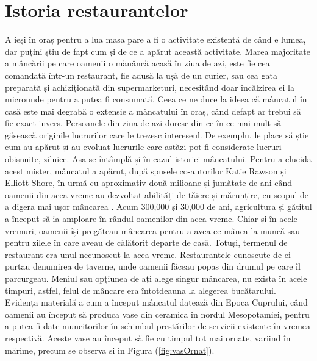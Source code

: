 \documentclass[a4paper,12pt]{book}
\begin{document}
\section{Istoria restaurantelor}
A ieși în oraș pentru a lua masa pare a fi o activitate existentă de când e lumea, dar puțini știu de fapt cum și de ce a apărut această activitate. Marea majoritate a mâncării pe care oamenii o mănâncă acasă în ziua de azi, este fie cea comandată într-un restaurant, fie adusă la ușă de un curier, sau cea gata preparată și achiziționată din supermarketuri, necesitând doar încălzirea ei la microunde pentru a putea fi consumată. Ceea ce ne duce la ideea că mâncatul în casă este mai degrabă o extensie a mâncatului în oraș, când defapt ar trebui să fie exact invers.
Persoanele din ziua de azi doresc din ce în ce mai mult să găsească originile lucrurilor care le trezesc intereseul. De exemplu, le place să știe cum au apărut și au evoluat lucrurile care astăzi pot fi considerate lucruri obișnuite, zilnice. Așa se întâmplă și în cazul istoriei mâncatului. Pentru a elucida acest mister, mâncatul a apărut, după spusele co-autorilor Katie Rawson și Elliott Shore, în urmă cu aproximativ două milioane și jumătate de ani când oamenii din acea vreme au dezvoltat abilități de tăiere și mărunțire, cu scopul de a digera mai ușor mâncarea . Acum 300,000 și 30,000  de ani, agricultura și gătitul a început să ia amploare în rândul oamenilor din acea vreme. \cite{History}
Chiar și în acele vremuri, oamenii își pregăteau mâncarea pentru a avea ce mânca la muncă sau pentru zilele în care aveau de călătorit departe de casă. Totuși, termenul de restaurant era unul necunoscut la acea vreme. Restaurantele cunoscute de ei purtau denumirea de taverne, unde oamenii făceau popas din drumul pe care îl parcurgeau. Meniul sau opțiunea de ați alege singur mâncarea, nu exista în acele timpuri, astfel,  felul de mâncare era întotdeauna la alegerea bucătarului.
Evidența materială a cum a început mâncatul datează din Epoca Cuprului, când oamenii au început să produca vase din ceramică în nordul Mesopotamiei, pentru a putea fi date muncitorilor în schimbul prestărilor de servicii existente în vremea respectivă. Aceste vase au început să fie cu timpul tot mai ornate, variind în mărime, precum se observa si in Figura (\ref{fig:vasOrnat}).
\end{document}
